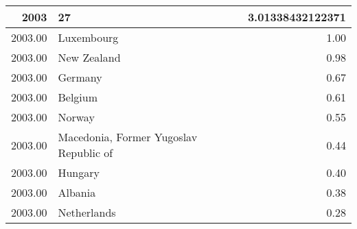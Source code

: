 \begin{table}[ht]
\centering
\begin{tabular}{rlr}
  \hline
2003 & 27 & 3.01338432122371 \\ 
  \hline
2003.00 & Luxembourg & 1.00 \\ 
  2003.00 & New Zealand & 0.98 \\ 
  2003.00 & Germany & 0.67 \\ 
  2003.00 & Belgium & 0.61 \\ 
  2003.00 & Norway & 0.55 \\ 
  2003.00 & Macedonia, Former Yugoslav Republic of & 0.44 \\ 
  2003.00 & Hungary & 0.40 \\ 
  2003.00 & Albania & 0.38 \\ 
  2003.00 & Netherlands & 0.28 \\ 
   \hline
\end{tabular}
\end{table}
